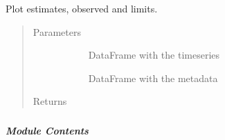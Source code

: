 \documentclass[letterpaper,10pt,english]{sphinxmanual}
\begin{document}
\begin{fulllineitems}
\label{\detokenize{autoapi/src/plot/altair/index:src.plot.altair.plot_all}}
Plot estimates, observed and limits.
\begin{quote}\begin{description}
\item[{Parameters}] \leavevmode\begin{description}
\item[{}] \leavevmode{[}\sphinxcode{\sphinxupquote{pd.DataFrame}}{]}
DataFrame with the timeseries

\item[{}] \leavevmode{[}\sphinxcode{\sphinxupquote{pd.DataFrame}}{]}
DataFrame with the metadata

\end{description}

\item[{Returns}] \leavevmode\begin{description}
\item[{  }] \leavevmode
\end{description}

\end{description}\end{quote}

\end{fulllineitems}



\subparagraph{}
\label{\detokenize{autoapi/src/plot/dashboard/index:module-src.plot.dashboard}}\label{\detokenize{autoapi/src/plot/dashboard/index:src-plot-dashboard}}\label{\detokenize{autoapi/src/plot/dashboard/index::doc}}

\subparagraph{Module Contents}
\label{\detokenize{autoapi/src/plot/dashboard/index:module-contents}}
\end{document}
